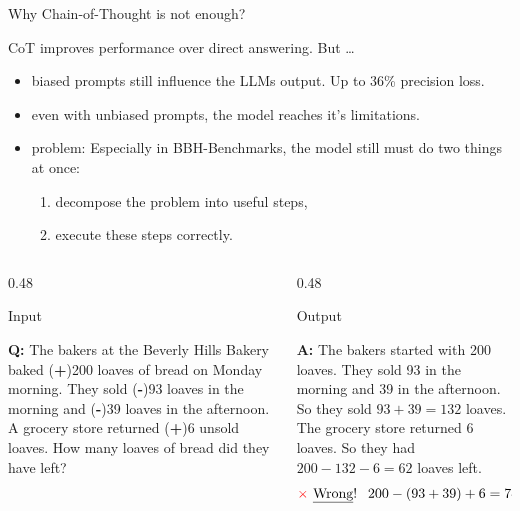 \begin{frame}{Why Chain-of-Thought is not enough?}
\small



\begin{block}{CoT improves performance over direct answering. But \dots}
    \begin{itemize}
    \item biased prompts still influence the LLMs output. Up to 36\% precision loss.
    \item even with unbiased prompts, the model reaches it's limitations.
    \item problem: Especially in BBH-Benchmarks, the model still must do two things at once:
    \begin{enumerate}
        \item decompose the problem into useful steps,
        \item execute these steps correctly.
    \end{enumerate}
\end{itemize}
\end{block}

\small

\begin{columns}[T]
\begin{column}{0.48\textwidth}

\begin{block}{Input}

\textbf{Q:} The bakers at the Beverly Hills Bakery baked (\small\textbf{+})200 loaves of bread on Monday morning. They sold (\small\textbf{-})93 loaves in the morning and (\small\textbf{-})39 loaves in the afternoon. A grocery store returned (\small\textbf{+})6 unsold loaves. How many loaves of bread did they have left?

\end{block}

\end{column}

\begin{column}{0.48\textwidth}
\begin{block}{\CoT{} Output}

\textbf{A:}
The bakers started with 200 loaves. They sold 93 in the morning and 39 in the afternoon. So they sold \(93 + 39 = 132\) loaves. The grocery store returned 6 loaves. So they had \(200 - 132 - 6 = 62\) loaves left.
\[
    \text{{\color{red}$\times$} \underline{Wrong}! }\ 200 - (93 + 39) + 6 = 74 
\] 


\end{block}
\end{column}
\end{columns}
\end{frame}
